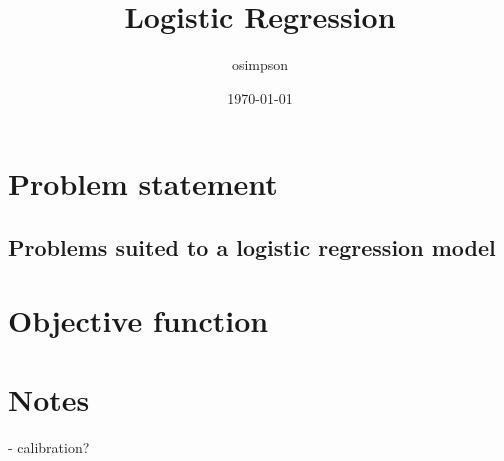\documentclass[12pt]{article}
\title{Logistic Regression}
\author{osimpson}
\date{\today}
\begin{document}
\maketitle

\section{Problem statement}



\subsection{Problems suited to a logistic regression model}



\section{Objective function}



\section{Notes}
- calibration?
\end{document}
